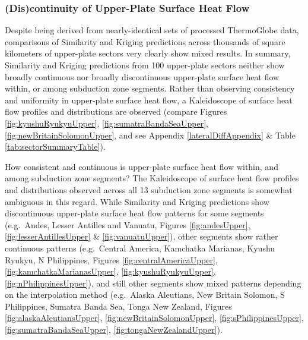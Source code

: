 \hypertarget{discontinuity-of-upper-plate-surface-heat-flow}{%
\subsubsection{(Dis)continuity of Upper-Plate Surface Heat Flow}\label{discontinuity-of-upper-plate-surface-heat-flow}}

Despite being derived from nearly-identical sets of processed ThermoGlobe data, comparisons of Similarity and Kriging predictions across thousands of square kilometers of upper-plate sectors very clearly show mixed results. In summary, Similarity and Kriging predictions from 100 upper-plate sectors neither show broadly continuous nor broadly discontinuous upper-plate surface heat flow within, or among subduction zone segments. Rather than observing consistency and uniformity in upper-plate surface heat flow, a Kaleidoscope of surface heat flow profiles and distributions are observed (compare Figures \ref{fig:kyushuRyukyuUpper}, \ref{fig:sumatraBandaSeaUpper}, \ref{fig:newBritainSolomonUpper}, and see Appendix \ref{lateralDiffAppendix} \& Table \ref{tab:sectorSummaryTable}).

How consistent and continuous is upper-plate surface heat flow within, and among subduction zone segments? The Kaleidoscope of surface heat flow profiles and distributions observed across all 13 subduction zone segments is somewhat ambiguous in this regard. While Similarity and Kriging predictions show discontinuous upper-plate surface heat flow patterns for some segments (e.g.~Andes, Lesser Antilles and Vanuatu, Figures \ref{fig:andesUpper}, \ref{fig:lesserAntillesUpper} \& \ref{fig:vanuatuUpper}), other segments show rather continuous patterns (e.g.~Central America, Kamchatka Marianas, Kyushu Ryukyu, N Philippines, Figures \ref{fig:centralAmericaUpper}, \ref{fig:kamchatkaMarianasUpper}, \ref{fig:kyushuRyukyuUpper}, \ref{fig:nPhilippinesUpper}), and still other segments show mixed patterns depending on the interpolation method (e.g.~Alaska Aleutians, New Britain Solomon, S Philippines, Sumatra Banda Sea, Tonga New Zealand, Figures \ref{fig:alaskaAleutiansUpper}, \ref{fig:newBritainSolomonUpper}, \ref{fig:sPhilippinesUpper}, \ref{fig:sumatraBandaSeaUpper}, \ref{fig:tongaNewZealandUpper}).

